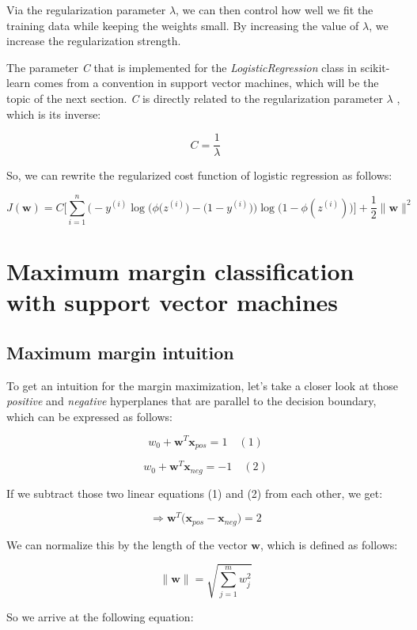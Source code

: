 \documentclass[letterpaper]{report}
\begin{document}
Via the regularization parameter $\lambda$, we can then control how well we fit the training data while keeping the weights small. By increasing the value of $\lambda$, we increase the regularization strength. 

The parameter \textit{C} that is implemented for the \textit{LogisticRegression} class in scikit-learn comes from a convention in support vector machines, which will be the topic of the next section. \textit{C} is directly related to the regularization parameter $\lambda$ , which is its inverse:

\[
C = \frac{1}{\lambda}
\]

So, we can rewrite the regularized cost function of logistic regression as follows:

\[
J(\mathbf{w}) = C \Bigg[  \sum_{i=1}^{n} \Big(   -y^{(i)} \log \big( \phi(z^{(i)} \big) - \big(  1 - y^{(i)} \big)    \Big) \log \bigg( 1 - \phi(z^{(i)}) \bigg)         \Bigg] + \frac{1}{2} \lVert \mathbf{w} \rVert^2
\]




\section{Maximum margin classification with support vector machines}

\subsection{Maximum margin intuition}

To get an intuition for the margin maximization, let's take a closer look at those \textit{positive} and \textit{negative} hyperplanes that are parallel to the decision boundary, which can be expressed as follows:

\[
w_0 + \mathbf{w}^T \mathbf{x}_{pos} = 1 \quad (1)
\]

\[
w_0 + \mathbf{w}^T \mathbf{x}_{neg} = -1 \quad (2)
\]

If we subtract those two linear equations (1) and (2) from each other, we get:

\[
\Rightarrow \mathbf{w}^T \big(  \mathbf{x}_{pos} - \mathbf{x}_{neg} \big) = 2
\]

We can normalize this by the length of the vector $\mathbf{w}$, which is defined as follows:

\[
\lVert \mathbf{w} \rVert = \sqrt{\sum_{j=1}^{m} w_{j}^{2}} 
\]

So we arrive at the following equation:
\end{document}
